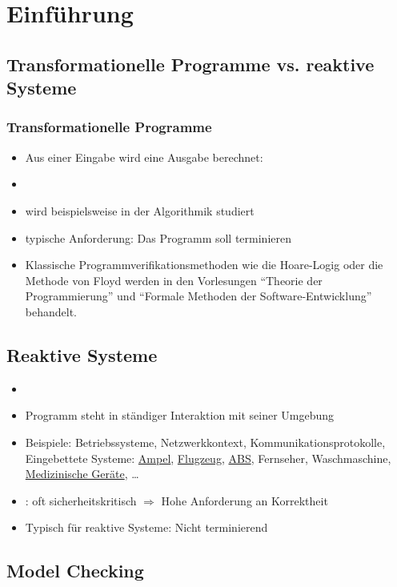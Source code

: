 \section{Einführung}
\label{sec:para1}
\nextlecture
\subsection*{Transformationelle Programme vs. reaktive Systeme}
\subsubsection*{Transformationelle Programme}
\begin{itemize}
	\item Aus einer Eingabe wird eine Ausgabe berechnet:
	\item[] 
	\item wird beispielsweise in der Algorithmik studiert
	\item typische Anforderung: Das Programm soll terminieren
	\item Klassische Programmverifikationsmethoden wie die Hoare-Logig oder die Methode von Floyd werden in den Vorlesungen \enquote{Theorie der Programmierung} und \enquote{Formale Methoden der Software-Entwicklung} behandelt.
\end{itemize}

\subsection*{Reaktive Systeme}
\begin{itemize}
	\item[] 
	\item Programm steht in ständiger Interaktion mit seiner Umgebung
	\item Beispiele: Betriebssysteme, Netzwerkkontext, Kommunikationsprotokolle, Eingebettete Systeme: \underline{Ampel}, \underline{Flugzeug}, \underline{ABS}, Fernseher, Waschmaschine, \underline{Medizinische Geräte}, \dots
	\item[] \textunderscore: oft sicherheitskritisch $\Rightarrow$ Hohe Anforderung an Korrektheit
	\item Typisch für reaktive Systeme: Nicht terminierend
\end{itemize}

\subsection*{Model Checking}

\cleardoubleoddemptypage
